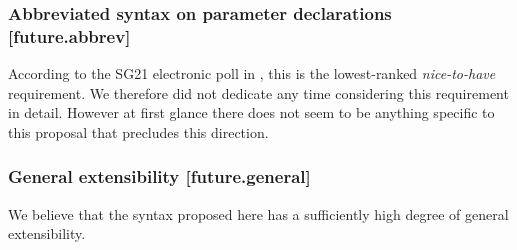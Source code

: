 \subsubsection{Abbreviated syntax on parameter declarations  [future.abbrev]}

According to the SG21 electronic poll in \cite{P2885R2}, this is the lowest-ranked \emph{nice-to-have} requirement. We therefore did not dedicate any time considering this requirement in detail. However at first glance there does not seem to be anything specific to this proposal that precludes this direction.

\subsubsection{General extensibility  [future.general]}

We believe that the syntax proposed here has a sufficiently high degree of general extensibility.

\label{subsec:future}





\renewcommand{\bibname}{References}




